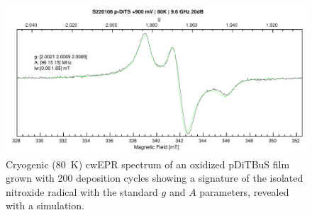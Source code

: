 \begin{figure}[h]
\center
	\includegraphics[width=1\textwidth]{./operando_epr/figures/CRYO/S220106_p-DiTS_OX_80K_CW_SIM.pdf}
	\caption{Cryogenic (80~K) cwEPR spectrum of an oxidized pDiTBuS film grown with 200 deposition cycles showing a signature of the isolated nitroxide radical with the standard $g$ and $A$ parameters, revealed with a simulation.}
	\label{fig:cwEPR_CRYO_DiTBuS_CHG_SIM}
\end{figure}



